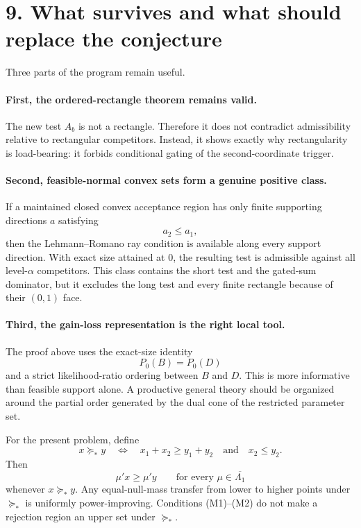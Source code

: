 \documentclass[12pt]{article}
\theoremstyle{definition}
\theoremstyle{remark}
\begin{document}
\section*{9. What survives and what should replace the conjecture}

Three parts of the program remain useful.

\paragraph{First, the ordered-rectangle theorem remains valid.}
The new test $A_b$ is not a rectangle.  Therefore it does not contradict admissibility relative to rectangular competitors.  Instead, it shows exactly why rectangularity is load-bearing: it forbids conditional gating of the second-coordinate trigger.

\paragraph{Second, feasible-normal convex sets form a genuine positive class.}
If a maintained closed convex acceptance region has only finite supporting directions $a$ satisfying
\[
a_2\le a_1,
\]
then the Lehmann--Romano ray condition is available along every support direction.  With exact size attained at $0$, the resulting test is admissible against all level-$\alpha$ competitors.  This class contains the short test and the gated-sum dominator, but it excludes the long test and every finite rectangle because of their $(0,1)$ face.

\paragraph{Third, the gain-loss representation is the right local tool.}
The proof above uses the exact-size identity
\[
P_0(B)=P_0(D)
\]
and a strict likelihood-ratio ordering between $B$ and $D$.  This is more informative than feasible support alone.  A productive general theory should be organized around the partial order generated by the dual cone of the restricted parameter set.

For the present problem, define
\[
x\succeq_* y
\quad\Longleftrightarrow\quad
x_1+x_2\ge y_1+y_2
\quad\text{and}\quad
x_2\le y_2.
\]
Then
\[
\mu'x\ge\mu'y
\qquad
\text{for every }\mu\in\overline{\Lambda_1}
\]
whenever $x\succeq_* y$.  Any equal-null-mass transfer from lower to higher points under $\succeq_*$ is uniformly power-improving.  Conditions (M1)--(M2) do not make a rejection region an upper set under $\succeq_*$.
\end{document}
